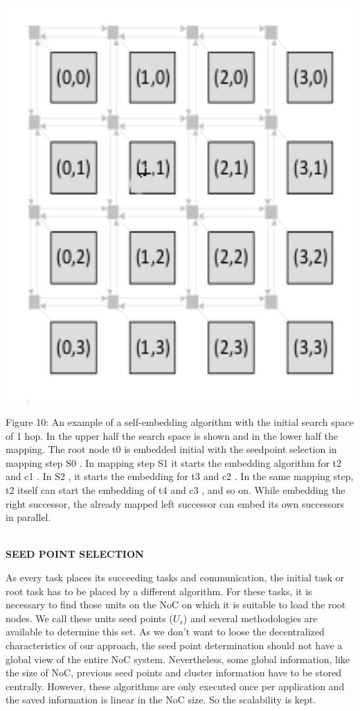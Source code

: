 \includegraphics[width=17cm]{images/12}

Figure 10: An example of a self-embedding algorithm with the initial
search space of 1 hop. In the upper half the search space is shown
and in the lower half the mapping. The root node t0 is embedded initial
with the seedpoint selection in mapping step S0 . In mapping step
S1 it starts the embedding algorithm for t2 and c1 . In S2 , it starts
the embedding for t3 and c2 . In the same mapping step, t2 itself
can start the embedding of t4 and c3 , and so on. While embedding
the right successor, the already mapped left successor can embed its
own successors in parallel. 

\ \\

\textbf{SEED POINT SELECTION} 

As every task places its succeeding tasks and communication, the initial
task or root task has to be placed by a different algorithm. For these
tasks, it is necessary to find those units on the NoC on which it
is suitable to load the root nodes. We call these units seed points
($U_{s}$) and several methodologies are available to determine this
set. As we don\textquoteright{}t want to loose the decentralized characteristics
of our approach, the seed point determination should not have a global
view of the entire NoC system. Nevertheless, some global information,
like the size of NoC, previous seed points and cluster information
have to be stored centrally. However, these algorithms are only executed
once per application and the saved information is linear in the NoC
size. So the scalability is kept. 

